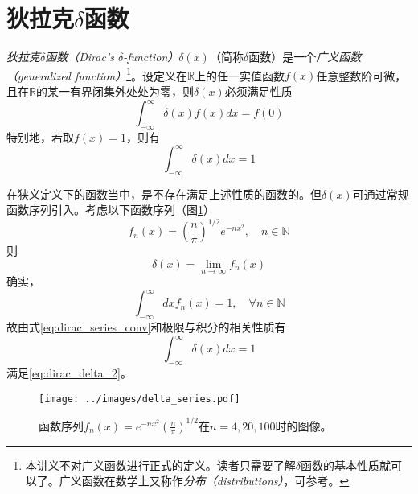 \documentclass[main.tex]{subfiles}
\begin{document}
\section{狄拉克$\delta$函数}
\emph{狄拉克$\delta$函数（Dirac's $\delta$-function）}$\delta\left(x\right)$（简称$\delta$函数）是一个\emph{广义函数（generalized function）}\footnote{本讲义不对广义函数进行正式的定义。读者只需要了解$\delta$函数的基本性质就可以了。广义函数在数学上又称作\emph{分布（distributions）}，可参考\cite{Richards1990}。}。设定义在$\mathbb{R}$上的任一实值函数$f\left(x\right)$任意整数阶可微，且在$\mathbb{R}$的某一有界闭集外处处为零，则$\delta\left(x\right)$必须满足性质
\begin{equation}\label{eq:dirac_delta_1}
    \int_{-\infty}^{\infty}\delta\left(x\right)f\left(x\right)dx=f\left(0\right)
\end{equation}
特别地，若取$f\left(x\right)=1$，则有
\begin{equation}\label{eq:dirac_delta_2}
    \int_{-\infty}^\infty\delta\left(x\right)dx=1
\end{equation}

在狭义定义下的函数当中，是不存在满足上述性质的函数的。但$\delta\left(x\right)$可通过常规函数序列引入。考虑以下函数序列（图\ref{fig:delta_series}）
\[f_n\left(x\right)=\left(\frac{n}{\pi}\right)^{1/2}e^{-nx^2},\quad n\in\mathbb{N}\]
则
\begin{equation}\label{eq:dirac_series_conv}
    \delta\left(x\right)=\lim_{n\to\infty}f_n\left(x\right)
\end{equation}
确实，
\[\int_{-\infty}^{\infty}dxf_n\left(x\right)=1,\quad\forall n\in\mathbb{N}\]
故由式\eqref{eq:dirac_series_conv}和极限与积分的相关性质有
\[\int_{-\infty}^\infty\delta\left(x\right)dx=1\]
满足\eqref{eq:dirac_delta_2}。

\begin{figure}[ht]
    \centering
    \texttt{[image: ../images/delta\_series.pdf]}
    \caption{函数序列$f_n\left(x\right)=e^{-nx^2}\left(\frac{n}{\pi}\right)^{1/2}$在$n=4,20,100$时的图像\cite{lighthill_1958}。}
    \label{fig:delta_series}
\end{figure}
\end{document}
